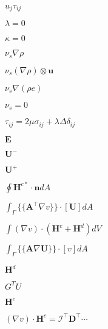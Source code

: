 \documentclass{article}
\begin{document}
$u_j \tau_{ij}$
\pagebreak

$\lambda=0$
\pagebreak

$\kappa=0$
\pagebreak

$\nu_s \nabla \rho$
\pagebreak

$\nu_s \left(\nabla \rho \right) \otimes \mathbf{u}$
\pagebreak

$\nu_s \nabla \left(\rho e\right)$
\pagebreak

$\nu_s=0$
\pagebreak

$ \tau_{ij}=2 \mu\sigma_{ij} + \lambda \Delta \delta_{ij}$
\pagebreak

$\mathbf{E}$
\pagebreak

$\mathbf{U}^-$
\pagebreak

$\mathbf{U}^+$
\pagebreak

$\oint \mathbf{H}^{c\ast}\cdot\mathbf{n}dA$
\pagebreak

$\int_{\Gamma} \{\{\mathbf{A}^{\intercal}\nabla v\}\} \cdot \left[\mathbf{U}\right] dA$
\pagebreak

$\int \left(\nabla v\right) \cdot \left(\mathbf{H}^c+\mathbf{H}^d\right)dV$
\pagebreak

$\int_{\Gamma} \{\{\mathbf{A}\nabla \mathbf{U}\}\} \cdot \left[v\right] dA$
\pagebreak

$\mathbf{H}^d$
\pagebreak

$G^T U$
\pagebreak

$\mathbf{H}^c$
\pagebreak

$(\nabla v)\cdot \mathbf{H}^c=\mathcal{I}^{\intercal}\mathbf{D}^{\intercal}\cdots$
\pagebreak
\end{document}
